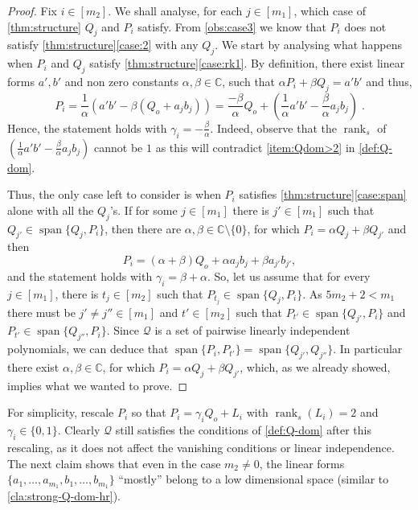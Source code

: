 \documentclass[10pt,a4paper]{article}
\def\rank{\operatorname{rank}}
\renewcommand{\C}{\mathbb{C}}
\newcommand{\cQ}{{\mathcal{Q}}}
\newcommand{\MVar}[2]{{#1}_1,\ldots, {#1}_{#2}}
\newcommand{\spn}[1]{\operatorname{span}\{{#1}\}}
\begin{document}
\begin{proof}
Fix $i\in [m_2]$. We shall analyse, for each $j \in [m_1]$, which case of \autoref{thm:structure} $Q_j$ and $P_i$ satisfy.
From \autoref{obs:case3} we know that $P_i$ does not satisfy \autoref{thm:structure}\ref{case:2} with any $Q_j$.
We start by analysing what happens when $P_i$ and  $Q_j$ satisfy \autoref{thm:structure}\ref{case:rk1}.  By definition, there exist linear forms  $a', b'$ and non zero constants $\alpha, \beta \in \C$, such that $\alpha P_i + \beta Q_j = a'b'$  and thus, 
\begin{equation}
\label{eq:case2}
P_i = \frac{1}{\alpha}\left(a'b' - \beta \left(Q_o+a_j b_j\right)\right) = \frac{-\beta}{\alpha}Q_o + \left(\frac{1}{\alpha} a'b' - \frac{\beta}{\alpha} a_j b_j\right) \;.
\end{equation} 
Hence, the statement holds with $\gamma_i = - \frac{\beta}{\alpha}$. Indeed, observe that the $\rank_s$ of $(\frac{1}{\alpha} a'b' - \frac{\beta}{\alpha} a_j b_j)$ cannot be $1$ as this will contradict \autoref{item:Qdom>2}  in \autoref{def:Q-dom}.

Thus, the only case left to consider is when $P_i$ satisfies \autoref{thm:structure}\ref{case:span} alone with all the $Q_j$'s. If for some $j\in [m_1]$ there is $j'\in [m_1]$ such that $Q_{j'}\in \spn{Q_j,P_i}$, then there are $\alpha, \beta \in \C\setminus\{0\}$, for which $P_i =\alpha Q_j + \beta Q_{j'}$ and then 
\[
P_i = (\alpha + \beta)Q_o + \alpha a_j b_j + \beta a_{j'} b_{j'},
\] and the statement holds with $\gamma_i =  \beta+ \alpha$. 
So, let us assume that for every $j \in [m_1]$, there is $t_j \in [m_2]$ such that $P_{t_j} \in \spn{Q_j,P_i}$. As $5m_2+2<m_1$ there must be $j'\neq j'' \in [m_1]$ and $t'\in [m_2]$ such that $P_{t'} \in \spn{Q_{j'}, P_i}$ and $ P_{t'} \in \spn{Q_{j''}, P_i}$. Since $\mathcal{Q}$ is a set of pairwise linearly independent polynomials, we can deduce that $\spn{P_i, P_{t'}} = \spn{Q_{j'}, Q_{j''}}$. In particular there exist  $\alpha, \beta \in \C$, for which $P_i =\alpha Q_j + \beta Q_{j'}$, which, as we already showed, implies what we wanted to prove.
\end{proof}

For simplicity, rescale $P_i$ so that $P_i = \gamma_i Q_o+L_i$ with $\rank_s(L_i)=2$ and $\gamma_i \in \{0,1\}$. Clearly $\cQ$ still satisfies the conditions of \autoref{def:Q-dom} after this rescaling, as it does not affect the vanishing conditions or linear independence. The next claim shows that even in the case $m_2\neq 0$, the linear forms $\lbrace \MVar{a}{m_1}, \MVar{b}{m_1}\rbrace$ ``mostly'' belong to a low dimensional space (similar to \autoref{cla:strong-Q-dom-hr}). 
\end{document}
